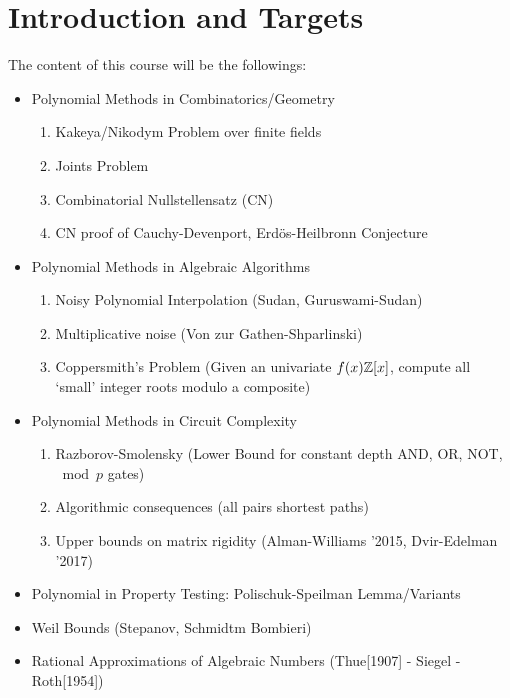 \documentclass[twoside]{article}
\begin{document}
\section{Introduction and Targets}
The content of this course will be the followings:
\begin{itemize}[label=$\bullet$]
	\item Polynomial Methods in Combinatorics/Geometry
	\begin{enumerate}
		\item Kakeya/Nikodym Problem over finite fields
		\item Joints Problem
		\item Combinatorial Nullstellensatz (CN)
		\item CN proof of Cauchy-Devenport, Erd\"{o}s-Heilbronn Conjecture
	\end{enumerate}
	\item Polynomial Methods in Algebraic Algorithms
	\begin{enumerate}
		\item Noisy Polynomial Interpolation (Sudan, Guruswami-Sudan)
		\item Multiplicative noise (Von zur Gathen-Shparlinski)
		\item Coppersmith's Problem (Given an univariate $f(x)\mathbb{Z}[x]$, compute all `small' integer roots modulo a composite)
	\end{enumerate}
	\item Polynomial Methods in Circuit Complexity
	\begin{enumerate}
		\item Razborov-Smolensky (Lower Bound for constant depth \textsc{AND}, \textsc{OR}, \textsc{NOT}, $\bmod p$ gates)
		\item Algorithmic consequences (all pairs shortest paths)
		\item Upper bounds on matrix rigidity (Alman-Williams '2015, Dvir-Edelman '2017)
	\end{enumerate}
	\item Polynomial in Property Testing: Polischuk-Speilman Lemma/Variants
	\item Weil Bounds (Stepanov, Schmidtm Bombieri)
	\item Rational Approximations of Algebraic Numbers (Thue[1907] - Siegel - Roth[1954])
\end{itemize}













\end{document}
